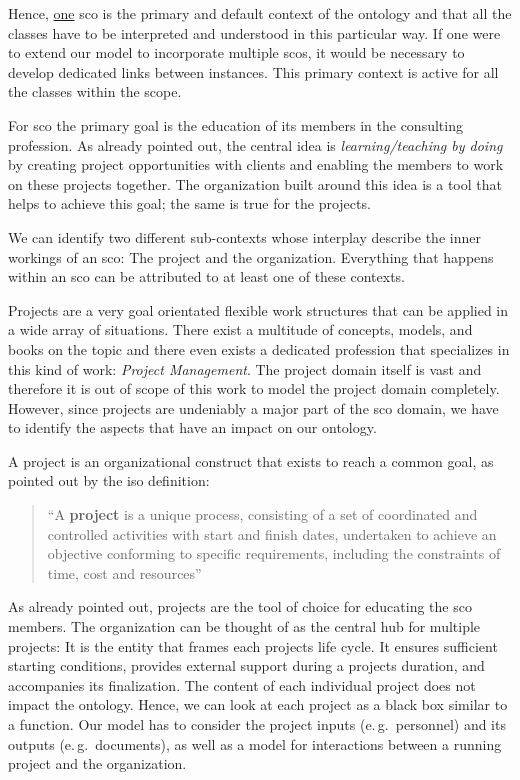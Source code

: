 \documentclass[a4paper, DIV=13, BCOR=0cm]{scrbook}
\newcommand{\eg}{e.\,g.\ }
\begin{document}
Hence, \underline{one} \gls{sco} is the primary and default context of the ontology and that all the classes have to be interpreted and understood in this particular way. If one were to extend our model to incorporate multiple \glspl{sco}, it would be necessary to develop dedicated links between instances. This primary context is active for all the classes within the scope.

For \gls{sco} the primary goal is the education of its members in the consulting profession. As already pointed out, the central idea is \textit{learning/teaching by doing} by creating project opportunities with clients and enabling the members to work on these projects together. The organization built around this idea is a tool that helps to achieve this goal; the same is true for the projects.

We can identify two different sub-contexts whose interplay describe the inner workings of an \gls{sco}: The project and the organization. Everything that happens within an \gls{sco} can be attributed to at least one of these contexts.

Projects are a very goal orientated flexible work structures that can be applied in a wide array of situations. There exist a multitude of concepts, models, and books on the topic and there even exists a dedicated profession that specializes in this kind of work: \textit{Project Management}. The project domain itself is vast and therefore it is out of scope of this work to model the project domain completely. However, since projects are undeniably a major part of the \gls{sco} domain, we have to identify the aspects that have an impact on our ontology. 

A project is an organizational construct that exists to reach a common goal, as pointed out by the \gls{iso} definition:

\begin{quote}
	\enquote{A \textbf{project} is a unique process, consisting of a set of coordinated and controlled activities with start and finish dates, undertaken to achieve an objective conforming to specific requirements, including the constraints of time, cost and resources} \cite{iso-9000-2015}
\end{quote}

As already pointed out, projects are the tool of choice for educating the \gls{sco} members. The organization can be thought of as the central hub for multiple projects: It is the entity that frames each projects life cycle. It ensures sufficient starting conditions, provides external support during a projects duration, and accompanies its finalization. The content of each individual project does not impact the ontology. Hence, we can look at each project as a black box similar to a function. Our model has to consider the project inputs (\eg personnel) and its outputs (\eg documents), as well as a model for interactions between a running project and the organization.
\end{document}
